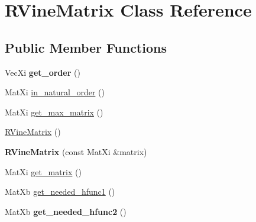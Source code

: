 \hypertarget{class_r_vine_matrix}{}\section{R\+Vine\+Matrix Class Reference}
\label{class_r_vine_matrix}
\subsection*{Public Member Functions}
\begin{DoxyCompactItemize}
\item 
Vec\+Xi {\bfseries get\+\_\+order} ()\hypertarget{class_r_vine_matrix_ab153356e21a86ccdf1e586eade3771b6}{}\label{class_r_vine_matrix_ab153356e21a86ccdf1e586eade3771b6}

\item 
Mat\+Xi \hyperlink{class_r_vine_matrix_aa4c4b6db1e03ca248e6ee2977d94c122}{in\+\_\+natural\+\_\+order} ()
\item 
Mat\+Xi \hyperlink{class_r_vine_matrix_a41f2c2fcfbf6cddb85783d164c26f7cf}{get\+\_\+max\+\_\+matrix} ()
\end{DoxyCompactItemize}
{\bf }\par
\begin{DoxyCompactItemize}
\item 
\hyperlink{class_r_vine_matrix_ab58141cea327509270023fc7ea28fc4a}{R\+Vine\+Matrix} ()
\item 
{\bfseries R\+Vine\+Matrix} (const Mat\+Xi \&matrix)\hypertarget{class_r_vine_matrix_a815d158891d25984bf199b459d77bb3c}{}\label{class_r_vine_matrix_a815d158891d25984bf199b459d77bb3c}

\end{DoxyCompactItemize}

{\bf }\par
\begin{DoxyCompactItemize}
\item 
Mat\+Xi \hyperlink{class_r_vine_matrix_a7ce70c0f0f93f3e42dde78797cce7ebc}{get\+\_\+matrix} ()
\end{DoxyCompactItemize}

{\bf }\par
\begin{DoxyCompactItemize}
\item 
Mat\+Xb \hyperlink{class_r_vine_matrix_a4492de2a5c849a09a48f2aacfa2da553}{get\+\_\+needed\+\_\+hfunc1} ()
\item 
Mat\+Xb {\bfseries get\+\_\+needed\+\_\+hfunc2} ()\hypertarget{class_r_vine_matrix_af986964fb480b66f7ccebde78dc98dfd}{}\label{class_r_vine_matrix_af986964fb480b66f7ccebde78dc98dfd}

\end{DoxyCompactItemize}

